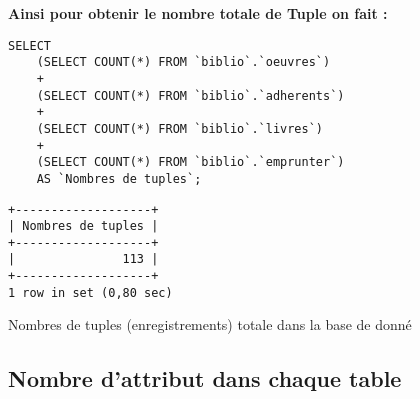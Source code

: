 \documentclass{article}
\begin{document}
\begin{center}
\textbf{Ainsi pour obtenir le nombre totale de Tuple on fait :}

\begin{minipage}{0.8\linewidth}
\begin{listing}[H]
\begin{verbatim}
SELECT 
	(SELECT COUNT(*) FROM `biblio`.`oeuvres`) 
	+
	(SELECT COUNT(*) FROM `biblio`.`adherents`)
	+
	(SELECT COUNT(*) FROM `biblio`.`livres`)
	+
	(SELECT COUNT(*) FROM `biblio`.`emprunter`)
	AS `Nombres de tuples`;
\end{verbatim}
\begin{verbatim}
+-------------------+
| Nombres de tuples |
+-------------------+
|               113 |
+-------------------+
1 row in set (0,80 sec)
\end{verbatim}
\caption{Nombres de tuples (enregistrements) totale dans la base de donné}
\end{listing}	
\end{minipage}
\end{center}


\subsection{Nombre d'attribut dans chaque table}
\end{document}
